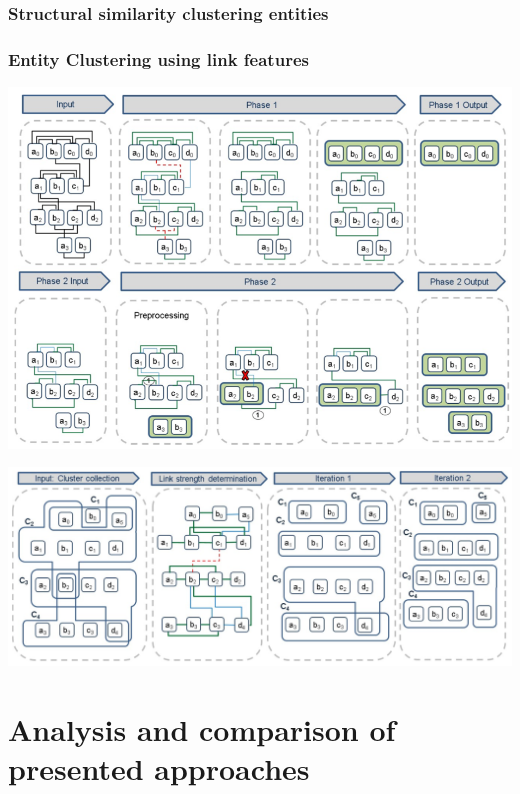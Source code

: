 \documentclass[runningheads]{llncs}
\begin{document}
\subsubsection{Structural similarity clustering entities}


\subsubsection{Entity Clustering using link features}


\begin{center}
\includegraphics[width=1\textwidth]{clip_example.png}
\end{center}

\begin{center}
\includegraphics[width=1\textwidth]{clip_overlap_resolution.png}
\end{center}


\section{Analysis and comparison of presented approaches}
\end{document}
